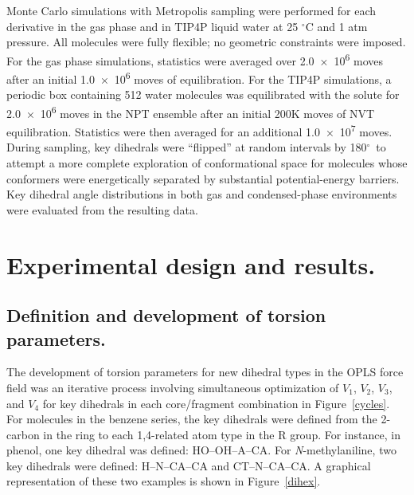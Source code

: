 \documentclass[12pt]{report}
\def\deg{$^{\circ}$}
\def\figlab{Figure}\def\figslab{\figlab s}
\newcommand*\fig[1]{\figlab~\ref{#1}}
\begin{document}
Monte Carlo simulations with Metropolis sampling were performed for each derivative in the gas phase and in TIP4P liquid water at 25 \deg C and 1 atm pressure. All molecules were fully flexible; no geometric constraints were imposed. For the gas phase simulations, statistics were averaged over \num{2.0e6} moves after an initial \num{1.0e6} moves of equilibration. For the TIP4P simulations, a periodic box containing 512 water molecules was equilibrated with the solute for \num{2.0e6} moves in the NPT ensemble after an initial 200K moves of NVT equilibration. Statistics were then averaged for an additional \num{1.0e7} moves. During sampling, key dihedrals were ``flipped'' at random intervals by 180\deg\ to attempt a more complete exploration of conformational space for molecules whose conformers were energetically separated by substantial potential-energy barriers. Key dihedral angle distributions in both gas and condensed-phase environments were evaluated from the resulting data.


\section{Experimental design and results.}

\subsection{Definition and development of torsion parameters.}

The development of torsion parameters for new dihedral types in the OPLS force field was an iterative process involving simultaneous optimization of $V_1$, $V_2$, $V_3$, and $V_4$ for key dihedrals in each core/fragment combination in \fig{cycles}. For molecules in the benzene series, the key dihedrals were defined from the 2-carbon in the ring to each 1,4-related atom type in the R group. For instance, in phenol, one key dihedral was defined: HO--OH--A--CA. For \textit{N}-methylaniline, two key dihedrals were defined: H--N--CA--CA and CT--N--CA--CA. A graphical representation of these two examples is shown in \fig{dihex}.
\end{document}
